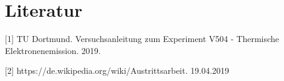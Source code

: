 \section{Literatur}

[1] TU Dortmund. Versuchsanleitung zum Experiment V504 - Thermische Elektronenemission. 2019.

[2] https://de.wikipedia.org/wiki/Austrittsarbeit. 19.04.2019